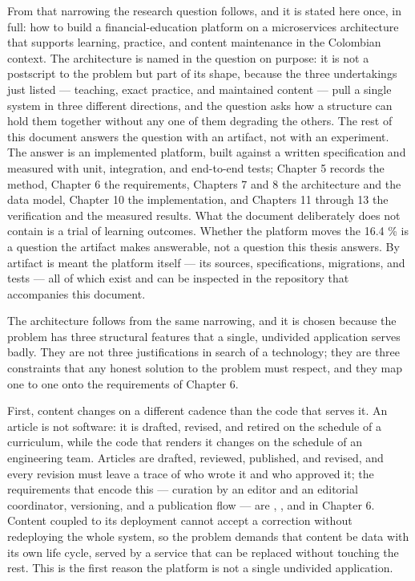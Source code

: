 From that narrowing the research question follows, and it is stated here once,
in full: how to build a financial-education platform on a microservices
architecture that supports learning, practice, and content maintenance in the
Colombian context. The architecture is named in the question on purpose: it is
not a postscript to the problem but part of its shape, because the three
undertakings just listed --- teaching, exact practice, and maintained
content --- pull a single system in three different directions, and the
question asks how a structure can hold them together without any one of them
degrading the others. The rest of this document answers the question with an
artifact, not with an experiment. The answer is an implemented platform, built
against a written specification and measured with unit, integration, and
end-to-end tests; Chapter 5 records the method, Chapter 6 the requirements,
Chapters 7 and 8 the architecture and the data model, Chapter 10 the
implementation, and Chapters 11 through 13 the verification and the measured
results. What the document deliberately does not contain is a trial of
learning outcomes. Whether the platform moves the 16.4 \% is a question the
artifact makes answerable, not a question this thesis answers. By artifact is
meant the platform itself --- its sources, specifications, migrations, and
tests --- all of which exist and can be inspected in the repository that
accompanies this document.

The architecture follows from the same narrowing, and it is chosen because the
problem has three structural features that a single, undivided application
serves badly. They are not three justifications in search of a technology;
they are three constraints that any honest solution to the problem must
respect, and they map one to one onto the requirements of Chapter 6.

First, content changes on a different cadence than the code that serves it. An
article is not software: it is drafted, revised, and retired on the schedule
of a curriculum, while the code that renders it changes on the schedule of an
engineering team. Articles are drafted, reviewed, published, and revised, and
every revision must leave a trace of who wrote it and who approved it; the
requirements that encode this --- curation by an editor and an editorial
coordinator, versioning, and a publication flow --- are ,
, and  in Chapter 6. Content coupled to its
deployment cannot accept a correction without redeploying the whole system, so
the problem demands that content be data with its own life cycle, served by a
service that can be replaced without touching the rest. This is the first
reason the platform is not a single undivided application.

